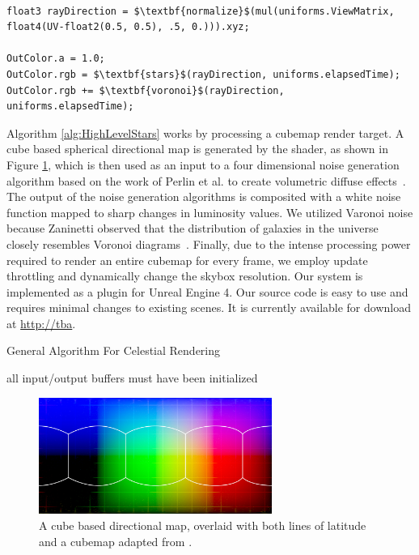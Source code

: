 \documentclass[review]{vgtc}                  %
\begin{document}
\begin{lstlisting}[caption={Fragment Shader for Celestial Rendering}, label={lst:shader}, float]

float3 rayDirection = $\textbf{normalize}$(mul(uniforms.ViewMatrix, float4(UV-float2(0.5, 0.5), .5, 0.))).xyz;

OutColor.a = 1.0;
OutColor.rgb = $\textbf{stars}$(rayDirection, uniforms.elapsedTime);
OutColor.rgb += $\textbf{voronoi}$(rayDirection, uniforms.elapsedTime);

\end{lstlisting}

Algorithm \ref{alg:HighLevelStars} works by processing a cubemap render target. A cube based spherical directional map is generated by the shader, as shown in Figure \ref{fig:cubemap}, which is then used as an input to a four dimensional noise generation algorithm based on the work of Perlin et al. to create volumetric diffuse effects~\cite{Perlin:2002}. The output of the noise generation algorithms is composited with a white noise function mapped to sharp changes in luminosity values. We utilized Varonoi noise because Zaninetti observed that the distribution of galaxies in the universe closely resembles Voronoi diagrams~\cite{Zaninetti:2013fa}.  Finally, due to the intense processing power required to render an entire cubemap for every frame, we employ update throttling and dynamically change the skybox resolution. Our system is implemented as a plugin for Unreal Engine 4. Our source code is easy to use and requires minimal changes to existing scenes. It is currently available for download at \url{http://tba}. 



\begin{algorithm}[tbh]                      %
	\caption{General Algorithm For Celestial Rendering}          %
	\label{alg:HighLevelStars}                           %
	\begin{algorithmic}[1]                    %
    \Ensure all input/output buffers must have been initialized
	\EndFor	
	\end{algorithmic}
\end{algorithm}
\begin{figure}[ht]
  \centering
  \includegraphics[width=3.0in]{../images/directioncubemap}
  \caption{A cube based directional map, overlaid with both lines of latitude and a cubemap adapted from \cite{EpicCube2016}.}
  \label{fig:cubemap}
\end{figure}
\end{document}
